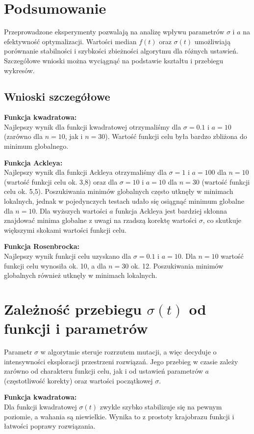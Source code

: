 \documentclass[a4paper,12pt]{article}
\begin{document}
\newpage
\section{Podsumowanie}
Przeprowadzone eksperymenty pozwalają na analizę wpływu parametrów $\sigma$ i $a$ na efektywność optymalizacji. Wartości median $f(t)$ oraz $\sigma(t)$ umożliwiają porównanie stabilności i szybkości zbieżności algorytmu dla różnych ustawień. Szczegółowe wnioski można wyciągnąć na podstawie kształtu i przebiegu wykresów.

\subsection*{Wnioski szczegółowe}
\textbf{Funkcja kwadratowa:} \\
Najlepszy wynik dla funkcji kwadratowej otrzymaliśmy dla $\sigma=0.1$ i $a=10$ (zarówno dla $n=10$, jak i $n=30$). Wartość funkcji celu była bardzo zbliżona do minimum globalnego.

\textbf{Funkcja Ackleya:} \\
Najlepszy wynik dla funkcji Ackleya otrzymaliśmy dla $\sigma=1$ i $a=100$ dla $n=10$ (wartość funkcji celu ok. 3{,}8) oraz dla $\sigma=10$ i $a=10$ dla $n=30$ (wartość funkcji celu ok. 5{,}5). Poszukiwania minimów globalnych często utknęły w minimach lokalnych, jednak w pojedynczych testach udało się osiągnąć minimum globalne dla $n=10$. Dla wyższych wartości $a$ funkcja Ackleya jest bardziej skłonna znajdować minima globalne z uwagi na rzadszą korektę wartości $\sigma$, co skutkuje większymi skokami wartości funkcji celu.

\textbf{Funkcja Rosenbrocka:} \\
Najlepszy wynik funkcji celu uzyskano dla $\sigma=0.1$ i $a=10$. Dla $n=10$ wartość funkcji celu wynosiła ok. 10, a dla $n=30$ ok. 12. Poszukiwania minimów globalnych również utknęły w minimach lokalnych.

\newpage
\section{Zależność przebiegu $\sigma(t)$ od funkcji i parametrów}
Parametr $\sigma$ w algorytmie steruje rozrzutem mutacji, a więc decyduje o intensywności eksploracji przestrzeni rozwiązań. Jego przebieg w czasie zależy zarówno od charakteru funkcji celu, jak i od ustawień parametrów $a$ (częstotliwość korekty) oraz wartości początkowej $\sigma$.

\textbf{Funkcja kwadratowa:} \\
Dla funkcji kwadratowej $\sigma(t)$ zwykle szybko stabilizuje się na pewnym poziomie, a wahania są niewielkie. Wynika to z prostoty krajobrazu funkcji i łatwości poprawy rozwiązania.
\end{document}
